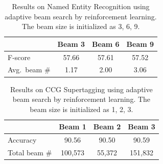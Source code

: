 \documentclass[11pt,a4paper]{article}
\begin{document}

\begin{table}
\centering
\caption{Results on Named Entity Recognition using adaptive beam search by reinforcement learning. The beam size is initialized as 3, 6, 9.}
\label{tab:NERRL}
\begin{tabular}{lccc}
\toprule
& Beam 3 & Beam 6 & Beam 9 \\
\midrule
F-score & 57.66 & 57.61 & 57.52 \\
Avg.~beam \# & 1.17 & 2.00 & 3.06 \\
\bottomrule
\end{tabular}
\end{table}


\begin{table}
\centering
\caption{Results on CCG Supertagging using adaptive beam search by reinforcement learning. The beam size is initialized as 1, 2, 3.}
\label{tab:CCGRL}
\begin{tabular}{lccc}
\toprule
& Beam 1 & Beam 2 & Beam 3 \\
\midrule
Accuracy & 90.56 & 90.50 & 90.59 \\
Total beam \# & 100,573 & 55,372 & 151,832 \\
\bottomrule
\end{tabular}
\end{table}
















\end{document}
